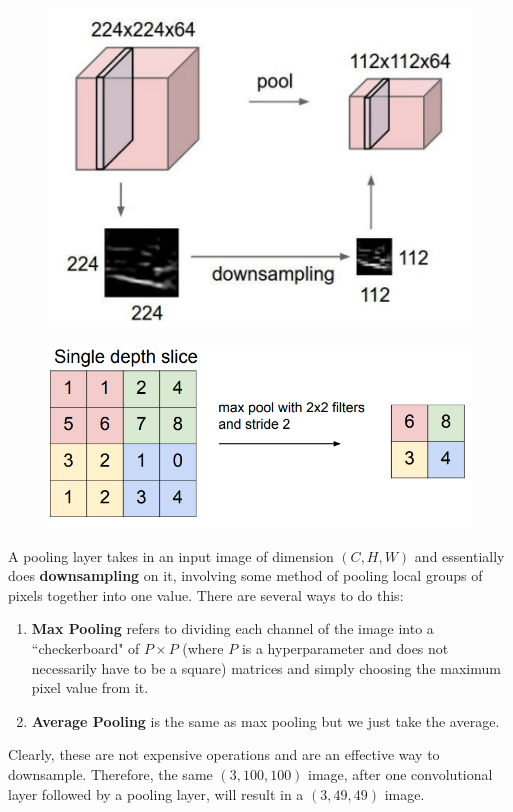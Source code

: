   \begin{figure}[H]
    \centering 
    \includegraphics[scale=0.4]{img/03_CNN/max_pool1.png}
    \caption{} 
    \label{fig:max_pool1}
  \end{figure}

  \begin{figure}[H]
    \centering 
    \includegraphics[scale=0.4]{img/03_CNN/max_pool2.png}
    \caption{} 
    \label{fig:max_pool2}
  \end{figure}

  \begin{definition}
    A pooling layer takes in an input image of dimension $(C, H, W)$ and essentially does \textbf{downsampling} on it, involving some method of pooling local groups of pixels together into one value. There are several ways to do this: 
    \begin{enumerate}
      \item \textbf{Max Pooling} refers to dividing each channel of the image into a ``checkerboard" of $P \times P$ (where $P$ is a hyperparameter and does not necessarily have to be a square) matrices and simply choosing the maximum pixel value from it. 
      \item \textbf{Average Pooling} is the same as max pooling but we just take the average. 
    \end{enumerate}
    Clearly, these are not expensive operations and are an effective way to downsample. Therefore, the same $(3, 100, 100)$ image, after one convolutional layer followed by a pooling layer, will result in a $(3, 49, 49)$ image.  
  \end{definition}

